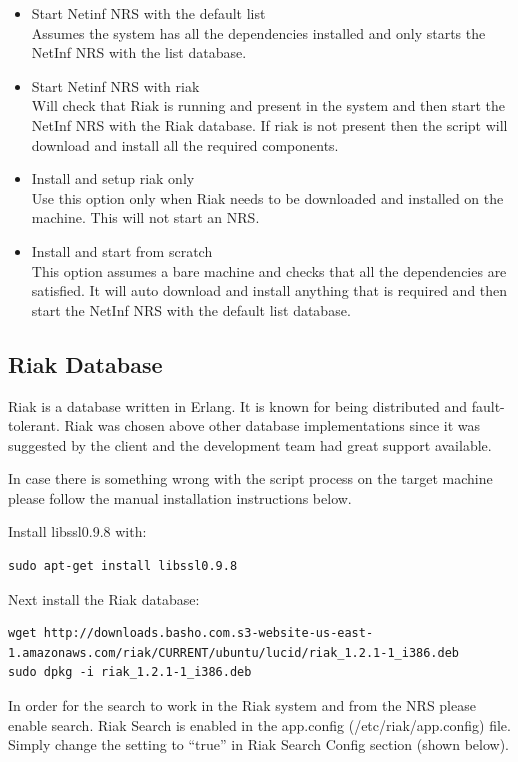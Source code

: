 \begin{itemize}
\item Start Netinf NRS with the default list\\
Assumes the system has all the dependencies installed and only starts the NetInf NRS with the list database.
\item Start Netinf NRS with riak\\
Will check that Riak is running and present in the system and then start the NetInf NRS with the Riak database.
If riak is not present then the script will download and install all the required components. 
\item Install and setup riak only\\
Use this option only when Riak needs to be downloaded and installed on the machine. This will not start an NRS.
\item Install and start from scratch\\
This option assumes a bare machine and checks that all the dependencies are satisfied. It will auto download and install anything that is required and then start the NetInf NRS with the default list database. 
\end{itemize}


\subsection{Riak Database}

Riak is a database written in Erlang. It is known for being distributed and fault-tolerant. Riak was chosen above other database implementations since it was suggested by the client and the development team had great support available. 

In case there is something wrong with the script process on the target machine please follow the manual installation instructions below.

Install libssl0.9.8 with:
\begin {verbatim}
sudo apt-get install libssl0.9.8
\end{verbatim}

Next install the Riak database:
\begin{verbatim}
wget http://downloads.basho.com.s3-website-us-east-1.amazonaws.com/riak/CURRENT/ubuntu/lucid/riak_1.2.1-1_i386.deb
sudo dpkg -i riak_1.2.1-1_i386.deb
\end{verbatim}

In order for the search to work in the Riak system and from the NRS please enable search.
Riak Search is enabled in the app.config (/etc/riak/app.config) file. Simply change the setting to “true” in Riak Search Config section (shown below).

